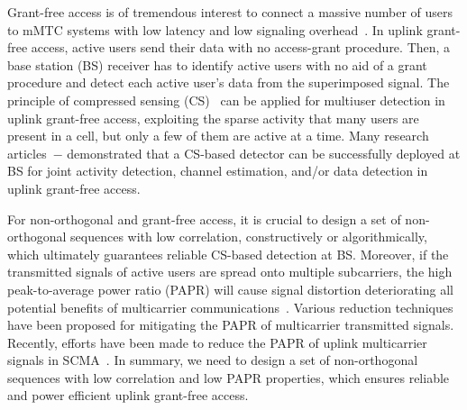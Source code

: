\documentclass[journal]{IEEEtran}
\newcommand{\Abu}{{\bf A}}
\numberwithin{const2}{const}
\begin{document}
Grant-free access is of tremendous interest to connect a massive number of users to mMTC systems
with low latency and low signaling overhead~\cite{Cirik:toward}.
In uplink grant-free access, 
active users send their data with no access-grant procedure.
Then, a base station (BS) receiver has to identify active users with no aid of a grant procedure
and detect each active user's data from the superimposed signal.
The principle of 
compressed sensing (CS)~\cite{Eldar:CS} can be applied for multiuser detection in uplink grant-free access,  %
exploiting the sparse activity that many users are present in a cell, %
but only a few of them are active at a time.
Many research articles~\cite{Abebe:iter}$-$\cite{Schober:meet} demonstrated that 
a CS-based detector can be successfully deployed at BS  
for joint activity detection, channel estimation, and/or data detection in uplink grant-free access.


For non-orthogonal and grant-free access, %
it is crucial to design a set of non-orthogonal sequences with low correlation,
constructively or algorithmically, which %
ultimately guarantees reliable %
CS-based detection at BS.
Moreover, if the transmitted signals of active users are spread %
onto multiple subcarriers,
the high peak-to-average power ratio (PAPR) 
will cause signal distortion
deteriorating all potential benefits of multicarrier communications~\cite{Litsyn:peak, No:papr}.
Various reduction techniques~\cite{No:papr} have been proposed for mitigating the PAPR
of multicarrier transmitted signals. %
Recently, efforts have been made to reduce the PAPR of uplink multicarrier signals in SCMA~\cite{Yani:ra, Mherich:golden}.
In summary, we need to design a set of
non-orthogonal sequences with low correlation and low PAPR properties,
which ensures reliable and power efficient uplink grant-free access. %
\end{document}
